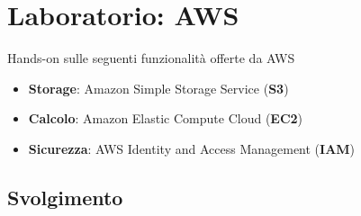 \newpage
\section{Laboratorio: AWS} \label{lab1}

Hands-on sulle seguenti funzionalità offerte da AWS
\begin{itemize}
    \item \textbf{Storage}: Amazon Simple Storage Service (\textbf{S3})
    \item \textbf{Calcolo}: Amazon Elastic Compute Cloud (\textbf{EC2})
    \item \textbf{Sicurezza}: AWS Identity and Access Management (\textbf{IAM})
\end{itemize}

\subsection{Svolgimento}
